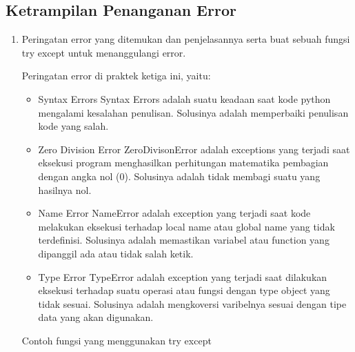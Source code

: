 \subsection{Ketrampilan Penanganan Error}
\begin{enumerate}
	\item Peringatan error yang ditemukan dan penjelasannya serta buat sebuah fungsi try except untuk menanggulangi error.
	
	Peringatan error di praktek ketiga ini, yaitu:
	\begin{itemize}
		\item Syntax Errors
		Syntax Errors adalah suatu keadaan saat kode python mengalami kesalahan penulisan. Solusinya adalah memperbaiki penulisan kode yang salah.
		
		\item Zero Division Error
		ZeroDivisonError adalah exceptions yang terjadi saat eksekusi program menghasilkan perhitungan matematika pembagian dengan angka nol (0). Solusinya adalah tidak membagi suatu yang hasilnya nol.
		
		\item Name Error
		NameError adalah exception yang terjadi saat kode melakukan eksekusi terhadap local name atau global name yang tidak terdefinisi. Solusinya adalah memastikan variabel atau function yang dipanggil ada atau tidak salah ketik.
		
		\item Type Error
		TypeError adalah exception yang terjadi saat dilakukan eksekusi terhadap suatu operasi atau fungsi dengan type object yang tidak sesuai. Solusinya adalah mengkoversi varibelnya sesuai dengan tipe data yang akan digunakan.
	\end{itemize}
	
	Contoh fungsi yang menggunakan try except
	
\end{enumerate}
